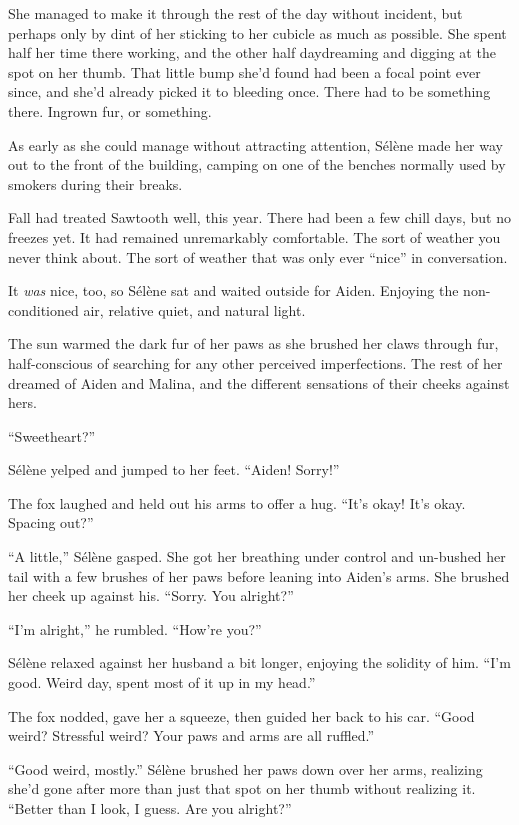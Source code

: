 She managed to make it through the rest of the day without incident, but perhaps only by dint of her sticking to her cubicle as much as possible. She spent half her time there working, and the other half daydreaming and digging at the spot on her thumb. That little bump she'd found had been a focal point ever since, and she'd already picked it to bleeding once. There had to be something there. Ingrown fur, or something.

As early as she could manage without attracting attention, Sélène made her way out to the front of the building, camping on one of the benches normally used by smokers during their breaks.

Fall had treated Sawtooth well, this year. There had been a few chill days, but no freezes yet. It had remained unremarkably comfortable. The sort of weather you never think about. The sort of weather that was only ever ``nice'' in conversation.

It \emph{was} nice, too, so Sélène sat and waited outside for Aiden. Enjoying the non-conditioned air, relative quiet, and natural light.

The sun warmed the dark fur of her paws as she brushed her claws through fur, half-conscious of searching for any other perceived imperfections. The rest of her dreamed of Aiden and Malina, and the different sensations of their cheeks against hers.

``Sweetheart?''

Sélène yelped and jumped to her feet. ``Aiden! Sorry!''

The fox laughed and held out his arms to offer a hug. ``It's okay! It's okay. Spacing out?''

``A little,'' Sélène gasped. She got her breathing under control and un-bushed her tail with a few brushes of her paws before leaning into Aiden's arms. She brushed her cheek up against his. ``Sorry. You alright?''

``I'm alright,'' he rumbled. ``How're you?''

Sélène relaxed against her husband a bit longer, enjoying the solidity of him. ``I'm good. Weird day, spent most of it up in my head.''

The fox nodded, gave her a squeeze, then guided her back to his car. ``Good weird? Stressful weird? Your paws and arms are all ruffled.''

``Good weird, mostly.'' Sélène brushed her paws down over her arms, realizing she'd gone after more than just that spot on her thumb without realizing it. ``Better than I look, I guess. Are you alright?''

